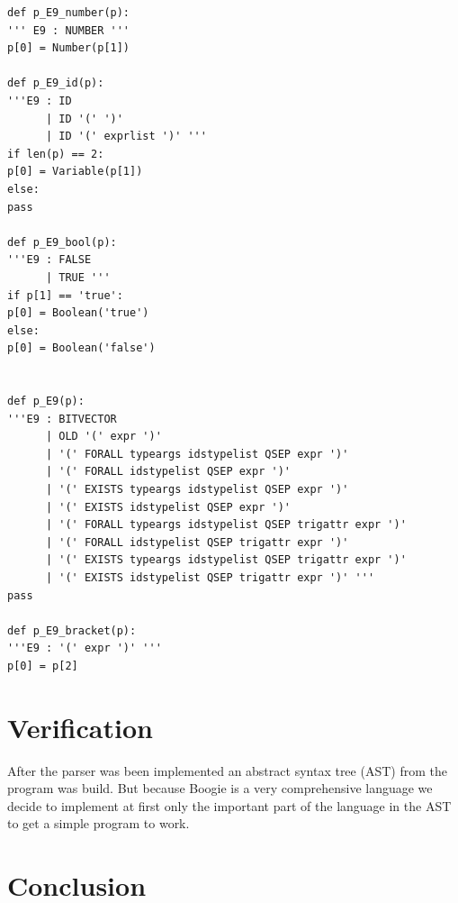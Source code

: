 \documentclass[paper=a4, fontsize=12pt]{scrartcl}
\begin{document}
\begin{lstlisting}[caption=Boogie program example, label=lst:e9]
def p_E9_number(p):
''' E9 : NUMBER '''
p[0] = Number(p[1])

def p_E9_id(p):
'''E9 : ID
      | ID '(' ')'
      | ID '(' exprlist ')' '''
if len(p) == 2:
p[0] = Variable(p[1])
else:
pass 

def p_E9_bool(p):
'''E9 : FALSE
      | TRUE '''
if p[1] == 'true':
p[0] = Boolean('true')
else:
p[0] = Boolean('false')	


def p_E9(p):
'''E9 : BITVECTOR
      | OLD '(' expr ')'
      | '(' FORALL typeargs idstypelist QSEP expr ')'
      | '(' FORALL idstypelist QSEP expr ')'
      | '(' EXISTS typeargs idstypelist QSEP expr ')'
      | '(' EXISTS idstypelist QSEP expr ')'
      | '(' FORALL typeargs idstypelist QSEP trigattr expr ')'
      | '(' FORALL idstypelist QSEP trigattr expr ')'
      | '(' EXISTS typeargs idstypelist QSEP trigattr expr ')'
      | '(' EXISTS idstypelist QSEP trigattr expr ')' '''
pass

def p_E9_bracket(p):
'''E9 : '(' expr ')' '''
p[0] = p[2]
\end{lstlisting}

\section{Verification}
After the parser was been implemented an abstract syntax tree (AST) from the program was build. But because Boogie is a very comprehensive language we decide to implement at first only the important part of the language in the AST to get a simple program to work.



\section{Conclusion}



 

\end{document}
